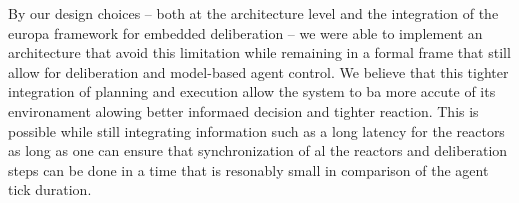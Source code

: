 By our design choices -- both at the architecture level and the integration of
the europa framework for embedded deliberation -- we were able to
implement an architecture that avoid this limitation while remaining in
a formal frame that still allow for deliberation and model-based
agent control. We believe that this tighter integration of planning
and execution allow the system to ba more accute of its environament
alowing better informaed decision and tighter reaction. This is
possible while still integrating information such as a long latency
for the reactors as long as one can ensure that synchronization of al
the reactors and deliberation steps can be done in a time that is
resonably small in comparison of the agent tick duration.








